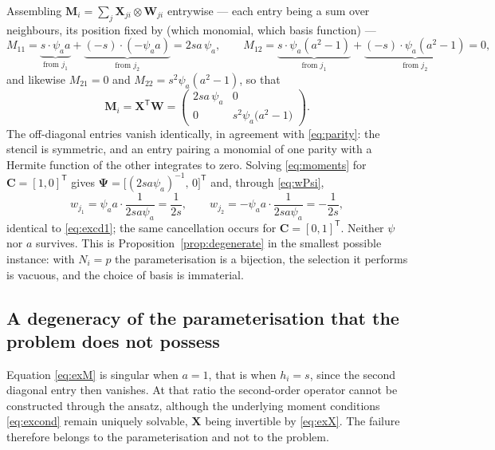 \documentclass[11pt,a4paper]{article}
\begin{document}
Assembling $\bm M_i=\sum_j\bm X_{ji}\otimes\bm W_{ji}$ entrywise --- each entry being a
sum over neighbours, its position fixed by (which monomial, which basis function) ---
\begin{equation}
M_{11}=\underbrace{s\cdot\psi_a a}_{\text{from }j_1}
      +\underbrace{(-s)\cdot(-\psi_a a)}_{\text{from }j_2}=2sa\,\psi_a,
\qquad
M_{12}=\underbrace{s\cdot\psi_a(a^{2}{-}1)}_{\text{from }j_1}
      +\underbrace{(-s)\cdot\psi_a(a^{2}{-}1)}_{\text{from }j_2}=0,
\label{eq:exMentry}
\end{equation}
and likewise $M_{21}=0$ and $M_{22}=s^{2}\psi_a(a^{2}-1)$, so that
\begin{equation}
\bm M_i=\bm X^{\mathsf T}\bm W=
\begin{pmatrix}
2sa\,\psi_a & 0\\[0.2em]
0 & s^{2}\psi_a\bigl(a^{2}-1\bigr)
\end{pmatrix}.
\label{eq:exM}
\end{equation}
The off-diagonal entries vanish identically, in agreement with \eqref{eq:parity}: the
stencil is symmetric, and an entry pairing a monomial of one parity with a Hermite
function of the other integrates to zero. Solving \eqref{eq:moments} for
$\bm C=[1,0]^{\mathsf T}$ gives
$\bm\Psi=\bigl[(2sa\psi_a)^{-1},\,0\bigr]^{\mathsf T}$ and, through \eqref{eq:wPsi},
\begin{equation}
w_{j_1}=\psi_a a\cdot\frac{1}{2sa\psi_a}=\frac{1}{2s},
\qquad
w_{j_2}=-\psi_a a\cdot\frac{1}{2sa\psi_a}=-\frac{1}{2s},
\label{eq:excancel}
\end{equation}
identical to \eqref{eq:excd1}; the same cancellation occurs for
$\bm C=[0,1]^{\mathsf T}$. Neither $\psi$ nor $a$ survives. This is
Proposition~\ref{prop:degenerate} in the smallest possible instance: with $N_i=p$ the
parameterisation is a bijection, the selection it performs is vacuous, and the choice
of basis is immaterial.

\subsection{A degeneracy of the parameterisation that the problem does not possess}

Equation \eqref{eq:exM} is singular when $a=1$, that is when $h_i=s$, since the
second diagonal entry then vanishes. At that ratio the second-order operator cannot be
constructed through the ansatz, although the underlying moment conditions
\eqref{eq:excond} remain uniquely solvable, $\bm X$ being invertible by \eqref{eq:exX}.
The failure therefore belongs to the parameterisation and not to the problem.
\end{document}
